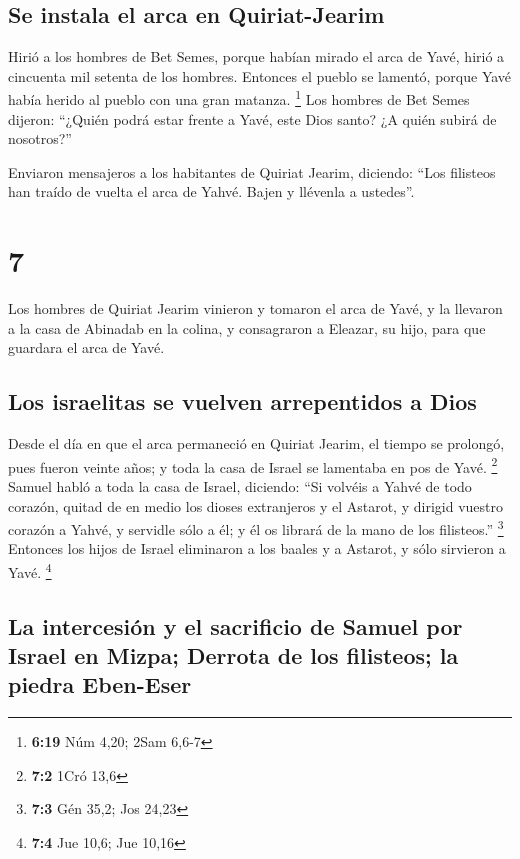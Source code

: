 \hypertarget{se-instala-el-arca-en-quiriat-jearim}{%
\subsection{Se instala el arca en
Quiriat-Jearim}\label{se-instala-el-arca-en-quiriat-jearim}}

 Hirió a los hombres de Bet Semes, porque habían mirado
el arca de Yavé, hirió a cincuenta mil setenta de los hombres. Entonces
el pueblo se lamentó, porque Yavé había herido al pueblo con una gran
matanza. \footnote{\textbf{6:19} Núm 4,20; 2Sam 6,6-7} 
Los hombres de Bet Semes dijeron: ``¿Quién podrá estar frente a Yavé,
este Dios santo? ¿A quién subirá de nosotros?''

 Enviaron mensajeros a los habitantes de Quiriat Jearim,
diciendo: ``Los filisteos han traído de vuelta el arca de Yahvé. Bajen y
llévenla a ustedes''.

\hypertarget{section-6}{%
\section{7}\label{section-6}}

 Los hombres de Quiriat Jearim vinieron y tomaron el arca
de Yavé, y la llevaron a la casa de Abinadab en la colina, y consagraron
a Eleazar, su hijo, para que guardara el arca de Yavé.

\hypertarget{los-israelitas-se-vuelven-arrepentidos-a-dios}{%
\subsection{Los israelitas se vuelven arrepentidos a
Dios}\label{los-israelitas-se-vuelven-arrepentidos-a-dios}}

 Desde el día en que el arca permaneció en Quiriat Jearim,
el tiempo se prolongó, pues fueron veinte años; y toda la casa de Israel
se lamentaba en pos de Yavé. \footnote{\textbf{7:2} 1Cró 13,6}
 Samuel habló a toda la casa de Israel, diciendo: ``Si
volvéis a Yahvé de todo corazón, quitad de en medio los dioses
extranjeros y el Astarot, y dirigid vuestro corazón a Yahvé, y servidle
sólo a él; y él os librará de la mano de los filisteos.'' \footnote{\textbf{7:3}
  Gén 35,2; Jos 24,23}  Entonces los hijos de Israel
eliminaron a los baales y a Astarot, y sólo sirvieron a Yavé.
\footnote{\textbf{7:4} Jue 10,6; Jue 10,16}

\hypertarget{la-intercesiuxf3n-y-el-sacrificio-de-samuel-por-israel-en-mizpa-derrota-de-los-filisteos-la-piedra-eben-eser}{%
\subsection{La intercesión y el sacrificio de Samuel por Israel en
Mizpa; Derrota de los filisteos; la piedra
Eben-Eser}\label{la-intercesiuxf3n-y-el-sacrificio-de-samuel-por-israel-en-mizpa-derrota-de-los-filisteos-la-piedra-eben-eser}}


